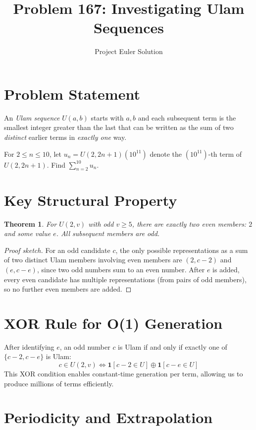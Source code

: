 \documentclass[11pt]{article}
\title{Problem 167: Investigating Ulam Sequences}
\author{Project Euler Solution}
\date{}
\newtheorem{theorem}{Theorem}
\theoremstyle{definition}
\begin{document}
\maketitle

\section{Problem Statement}
An \emph{Ulam sequence} $U(a,b)$ starts with $a, b$ and each subsequent term is the smallest integer greater than the last that can be written as the sum of two \emph{distinct} earlier terms in \emph{exactly one} way.

For $2 \le n \le 10$, let $u_n = U(2, 2n+1)(10^{11})$ denote the $(10^{11})$-th term of $U(2, 2n+1)$. Find $\sum_{n=2}^{10} u_n$.

\section{Key Structural Property}

\begin{theorem}
For $U(2, v)$ with odd $v \ge 5$, there are exactly two even members: $2$ and some value $e$. All subsequent members are odd.
\end{theorem}

\begin{proof}[Proof sketch]
For an odd candidate $c$, the only possible representations as a sum of two distinct Ulam members involving even members are $(2, c-2)$ and $(e, c-e)$, since two odd numbers sum to an even number. After $e$ is added, every even candidate has multiple representations (from pairs of odd members), so no further even members are added.
\end{proof}

\section{XOR Rule for O(1) Generation}

After identifying $e$, an odd number $c$ is Ulam if and only if exactly one of $\{c-2, c-e\}$ is Ulam:
\[
c \in U(2,v) \iff \mathbf{1}[c-2 \in U] \oplus \mathbf{1}[c-e \in U]
\]
This XOR condition enables constant-time generation per term, allowing us to produce millions of terms efficiently.

\section{Periodicity and Extrapolation}
\end{document}
